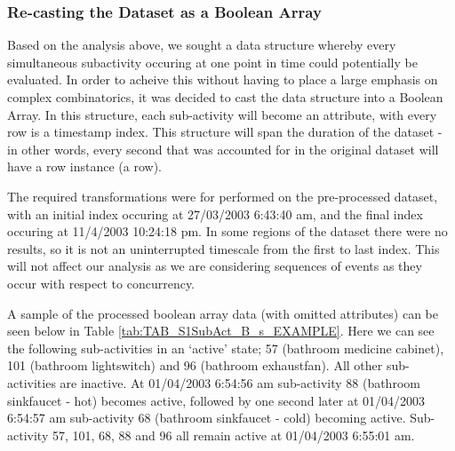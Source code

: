 \documentclass[11pt,]{article}
\begin{document}
\hypertarget{re-casting-the-dataset-as-a-boolean-array}{%
\subsubsection{Re-casting the Dataset as a Boolean
Array}\label{re-casting-the-dataset-as-a-boolean-array}}

Based on the analysis above, we sought a data structure whereby every
simultaneous subactivity occuring at one point in time could potentially
be evaluated. In order to acheive this without having to place a large
emphasis on complex combinatorics, it was decided to cast the data
structure into a Boolean Array. In this structure, each sub-activity
will become an attribute, with every row is a timestamp index. This
structure will span the duration of the dataset - in other words, every
second that was accounted for in the original dataset will have a row
instance (a row).

The required transformations were for performed on the pre-processed
dataset, with an initial index occuring at 27/03/2003 6:43:40 am, and
the final index occuring at 11/4/2003 10:24:18 pm. In some regions of
the dataset there were no results, so it is not an uninterrupted
timescale from the first to last index. This will not affect our
analysis as we are considering sequences of events as they occur with
respect to concurrency.

A sample of the processed boolean array data (with omitted attributes)
can be seen below in Table \ref{tab:TAB_S1SubAct_B_s_EXAMPLE}. Here we
can see the following sub-activities in an `active' state; 57 (bathroom
medicine cabinet), 101 (bathroom lightswitch) and 96 (bathroom
exhaustfan). All other sub-activities are inactive. At 01/04/2003
6:54:56 am sub-activity 88 (bathroom sinkfaucet - hot) becomes active,
followed by one second later at 01/04/2003 6:54:57 am sub-activity 68
(bathroom sinkfaucet - cold) becoming active. Sub-activity 57, 101, 68,
88 and 96 all remain active at 01/04/2003 6:55:01 am.
\end{document}
